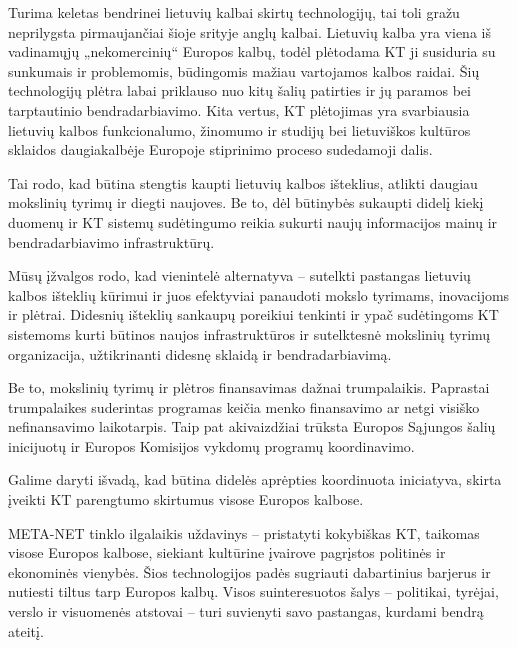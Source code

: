 \documentclass[]{../metanetpaper}
\begin{document}
\begin{multicols}{2}
    Turima keletas bendrinei lietuvių kalbai skirtų technologijų, tai toli gražu neprilygsta pirmaujančiai šioje srityje anglų kalbai. Lietuvių kalba yra viena iš vadinamųjų „nekomercinių“ Europos kalbų, todėl plėtodama KT ji susiduria su sunkumais ir problemomis, būdingomis mažiau vartojamos kalbos raidai. Šių technologijų plėtra labai priklauso nuo kitų šalių patirties ir jų paramos bei tarptautinio bendradarbiavimo. Kita vertus, KT plėtojimas yra svarbiausia lietuvių kalbos funkcionalumo, žinomumo ir studijų bei lietuviškos kultūros sklaidos daugiakalbėje Europoje stiprinimo proceso sudedamoji dalis.   

    Tai rodo, kad būtina stengtis kaupti lietuvių kalbos išteklius, atlikti daugiau mokslinių tyrimų ir diegti naujoves. Be to, dėl būtinybės sukaupti didelį kiekį duomenų ir KT sistemų sudėtingumo reikia sukurti naujų informacijos mainų ir bendradarbiavimo infrastruktūrų.   

Mūsų įžvalgos rodo, kad vienintelė alternatyva – sutelkti pastangas lietuvių kalbos išteklių kūrimui ir juos efektyviai panaudoti mokslo tyrimams, inovacijoms ir plėtrai. Didesnių išteklių sankaupų poreikiui tenkinti ir ypač sudėtingoms KT sistemoms kurti būtinos naujos infrastruktūros ir sutelktesnė mokslinių tyrimų organizacija, užtikrinanti didesnę sklaidą ir bendradarbiavimą.

    Be to, mokslinių tyrimų ir plėtros finansavimas dažnai trumpalaikis. Paprastai trumpalaikes suderintas programas keičia menko finansavimo ar  netgi visiško nefinansavimo laikotarpis. Taip pat akivaizdžiai trūksta Europos Sąjungos šalių inicijuotų ir Europos Komisijos vykdomų programų koordinavimo.   

    Galime daryti išvadą, kad būtina didelės aprėpties koordinuota iniciatyva, skirta įveikti KT parengtumo skirtumus  visose Europos kalbose.

META-NET tinklo ilgalaikis uždavinys – pristatyti kokybiškas KT, taikomas visose Europos kalbose, siekiant kultūrine įvairove pagrįstos politinės ir ekonominės vienybės. Šios technologijos padės sugriauti dabartinius barjerus ir nutiesti tiltus tarp Europos kalbų. Visos suinteresuotos šalys – politikai, tyrėjai, verslo ir visuomenės atstovai – turi suvienyti savo pastangas, kurdami bendrą ateitį. 
\end{multicols}

\cleardoublepage

\end{document}
